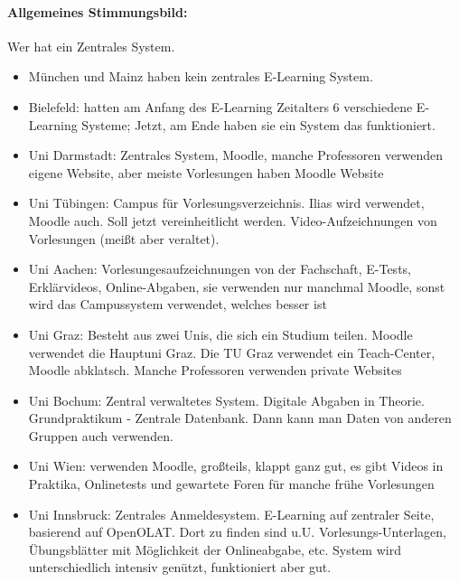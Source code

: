 \begin{itemize}
			 \paragraph{Allgemeines Stimmungsbild:}
			   Wer hat ein Zentrales System. \\

				\begin{itemize}
					\item München und Mainz haben kein zentrales E-Learning System.  \\
					\item Bielefeld: hatten am Anfang des E-Learning Zeitalters 6 verschiedene E-Learning Systeme;
						Jetzt, am Ende haben sie ein System das funktioniert. \\
					\item Uni Darmstadt: Zentrales System, Moodle, manche Professoren verwenden eigene Website, aber meiste Vorlesungen haben Moodle Website \\
					\item Uni Tübingen: Campus für Vorlesungsverzeichnis. Ilias wird verwendet, Moodle auch. Soll jetzt vereinheitlicht werden. Video-Aufzeichnungen von Vorlesungen (meißt aber veraltet). \\
					\item Uni Aachen: Vorlesungesaufzeichnungen von der Fachschaft, E-Tests, Erklärvideos, Online-Abgaben, sie verwenden nur manchmal Moodle, sonst wird das Campussystem verwendet, welches besser ist \\
					\item Uni Graz: Besteht aus zwei Unis, die sich ein Studium teilen. Moodle verwendet die Hauptuni Graz. Die TU Graz verwendet ein Teach-Center, Moodle abklatsch. Manche Professoren verwenden private Websites \\
					\item Uni Bochum: Zentral verwaltetes System. Digitale Abgaben in Theorie. Grundpraktikum - Zentrale Datenbank. Dann kann man Daten von anderen Gruppen auch verwenden. \\
					\item Uni Wien: verwenden Moodle, großteils, klappt ganz gut, es gibt Videos in Praktika, Onlinetests und gewartete Foren für manche frühe Vorlesungen \\
					\item Uni Innsbruck: Zentrales Anmeldesystem. E-Learning auf zentraler Seite, basierend auf OpenOLAT. Dort zu finden sind u.U. Vorlesungs-Unterlagen, Übungsblätter mit Möglichkeit der Onlineabgabe, etc. System wird unterschiedlich intensiv genützt, funktioniert aber gut. \\

\end{itemize}
\end{itemize}
